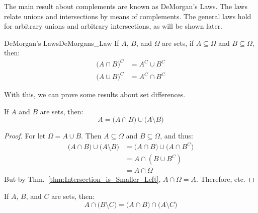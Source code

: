         The main result about complements are known as
        DeMorgan's Laws. The laws relate unions and
        intersections by means of complements. The general
        laws hold for arbitrary unions and arbitrary
        intersections, as will be shown later.
        \begin{ftheorem}{DeMorgan's Laws}{DeMorgans_Law}
            If $A$, $B$, and $\Omega$ are sets, if
            $A\subseteq\Omega$ and $B\subseteq\Omega$, then:
            \begin{subequations}
                \begin{align}
                    \big(A\cap{B}\big)^{C}
                    &=A^{C}\cup{B}^{C}\\
                    \big(A\cup{B}\big)^{C}
                    &=A^{C}\cap{B}^{C}
                \end{align}
            \end{subequations}
        \end{ftheorem}
        With this, we can prove some results about
        set differences.
        \begin{theorem}
            If $A$ and $B$ are sets, then:
            \begin{equation}
                A=\big(A\cap{B}\big)
                    \cup\big(A\setminus{B}\big)
            \end{equation}
        \end{theorem}
        \begin{proof}
            For let $\Omega=A\cup{B}$. Then
            $A\subseteq\Omega$ and $B\subseteq\Omega$,
            and thus:
            \begin{subequations}
                \begin{align}
                    \big(A\cap{B})\cup\big(A\setminus{B}\big)
                    &=\big(A\cap{B}\big)
                        \cup\big(A\cap{B}^{C}\big)\\
                    &=A\cap(B\cup{B}^{C})\\
                    &=A\cap\Omega
                \end{align}
            \end{subequations}
            But by Thm.~\ref{thm:Intersection_is_Smaller_Left},
            $A\cap\Omega=A$. Therefore, etc.
        \end{proof}
        \begin{theorem}
            If $A$, $B$, and $C$ are sets, then:
            \begin{equation}
                A\cap\big(B\setminus{C}\big)
                =\big(A\cap{B}\big)\cap\big(A\setminus{C}\big)
            \end{equation}
        \end{theorem}
